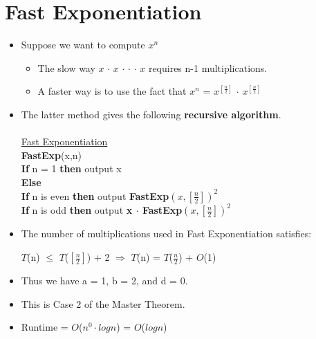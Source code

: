 \documentclass[12pt]{article}
\newcommand{\forceindent}{\leavevmode{\parindent=1em\indent}}
\begin{document}
\section{Fast Exponentiation}
\renewcommand{\labelitemii}{$\circ$}
\renewcommand{\labelitemiii}{$\cdot$}
\renewcommand{\labelitemiii}{$\rightarrow$}
\begin{itemize}
\item Suppose we want to compute $x^n$
	\begin{itemize}
	\item The slow way $x$ $\cdot$ $x$ $\cdot$ $\cdot$ $\cdot$ $x$ requires n-1 multiplications.
	\item A faster way is to use the fact that $x^n$ = $x^{[\frac{n}{2}]}$ $\cdot$ $x^{[\frac{n}{2}]}$
	\end{itemize}
\item The latter method gives the following \textbf{recursive algorithm}.\\
\\
{\large
\underline{Fast Exponentiation}\\
\textbf{FastExp}(x,n)\\
\textbf{If} n = 1 \textbf{then} output x\\
\textbf{Else} \\
\forceindent \textbf{If} n is even \textbf{then} output \textbf{FastExp}$(x,[\frac{n}{2}])^2$\\
\forceindent \textbf{If} n is odd \textbf{then} output \textbf{x $\cdot$ FastExp}$(x,[\frac{n}{2}])^2$
}
\item The number of multiplications used in Fast Exponentiation satisfies:
\begin{center}
{\large
$T$(n) $\leq$ $T$($[\frac{n}{2}]$) + 2 $\Rightarrow$ $T$(n) = $T$($\frac{n}{2}$) + $O$(1)}
\end{center}
\item Thus we have a = 1, b = 2, and d = 0.
\item This is Case 2 of the Master Theorem.
\item Runtime = $O$($n^0 \cdot log{}n$) = $O$($log{}n$)
\end{itemize}
\end{document}
